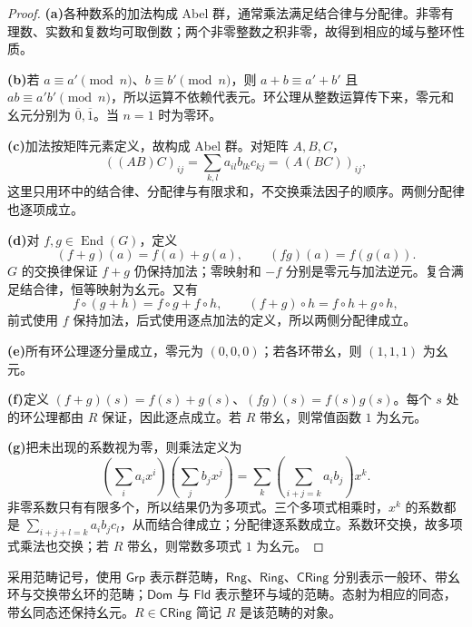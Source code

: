 \documentclass[lang=cn,a4paper,fontset=none,zihao=false,10pt,openany,twoside]{beautybook}
\numberwithin{algorithm}{chapter}
\begin{document}
\begin{proof}
\par\smallskip\noindent\textbf{(a)}\quad 各种数系的加法构成 Abel 群，通常乘法满足结合律与分配律。非零有理数、实数和复数均可取倒数；两个非零整数之积非零，故得到相应的域与整环性质。
\par\smallskip\noindent\textbf{(b)}\quad 若 $a\equiv a'\pmod n$、$b\equiv b'\pmod n$，则 $a+b\equiv a'+b'$ 且 $ab\equiv a'b'\pmod n$，所以运算不依赖代表元。环公理从整数运算传下来，零元和幺元分别为 $\overline0,\overline1$。当 $n=1$ 时为零环。
\par\smallskip\noindent\textbf{(c)}\quad 加法按矩阵元素定义，故构成 Abel 群。对矩阵 $A,B,C$，
\[
 ((AB)C)_{ij}=\sum_{k,l}a_{il}b_{lk}c_{kj}
             =(A(BC))_{ij},
\]
这里只用环中的结合律、分配律与有限求和，不交换乘法因子的顺序。两侧分配律也逐项成立。
\par\smallskip\noindent\textbf{(d)}\quad 对 $f,g\in\operatorname{End}(G)$，定义
\[
 (f+g)(a)=f(a)+g(a),\qquad(fg)(a)=f(g(a)).
\]
$G$ 的交换律保证 $f+g$ 仍保持加法；零映射和 $-f$ 分别是零元与加法逆元。复合满足结合律，恒等映射为幺元。又有
\[
 f\circ(g+h)=f\circ g+f\circ h,\qquad
 (f+g)\circ h=f\circ h+g\circ h,
\]
前式使用 $f$ 保持加法，后式使用逐点加法的定义，所以两侧分配律成立。
\par\smallskip\noindent\textbf{(e)}\quad 所有环公理逐分量成立，零元为 $(0,0,0)$；若各环带幺，则 $(1,1,1)$ 为幺元。
\par\smallskip\noindent\textbf{(f)}\quad 定义 $(f+g)(s)=f(s)+g(s)$、$(fg)(s)=f(s)g(s)$。每个 $s$ 处的环公理都由 $R$ 保证，因此逐点成立。若 $R$ 带幺，则常值函数 $1$ 为幺元。
\par\smallskip\noindent\textbf{(g)}\quad 把未出现的系数视为零，则乘法定义为
\[
 \left(\sum_i a_ix^i\right)\left(\sum_j b_jx^j\right)
   =\sum_k\left(\sum_{i+j=k}a_ib_j\right)x^k.
\]
非零系数只有有限多个，所以结果仍为多项式。三个多项式相乘时，$x^k$ 的系数都是 $\sum_{i+j+l=k}a_ib_jc_l$，从而结合律成立；分配律逐系数成立。系数环交换，故多项式乘法也交换；若 $R$ 带幺，则常数多项式 $1$ 为幺元。
\end{proof}

采用范畴记号，使用 $\mathsf{Grp}$ 表示群范畴，$\mathsf{Rng}$、$\mathsf{Ring}$、$\mathsf{CRing}$ 分别表示一般环、带幺环与交换带幺环的范畴；$\mathsf{Dom}$ 与 $\mathsf{Fld}$ 表示整环与域的范畴。态射为相应的同态，带幺同态还保持幺元。$R\in\mathsf{CRing}$ 简记 $R$ 是该范畴的对象。
\end{document}
